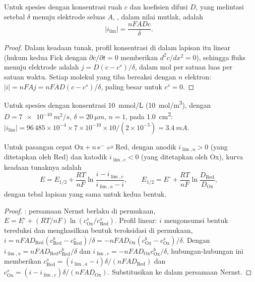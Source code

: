 \begin{theorem}\label{thm:b2:current-potential-curves:limiting}
Untuk spesies dengan konsentrasi ruah $c$ dan koefisien difusi $D$, yang
melintasi  setebal $\delta$ menuju elektrode seluas $A$, , dalam nilai mutlak, adalah
\[
  |i_{\lim}| = \frac{nFADc}{\delta} .
\]
\end{theorem}

\begin{proof}
Dalam keadaan tunak, profil konsentrasi di dalam lapisan itu linear (hukum
kedua Fick dengan $\partial c/\partial t = 0$ memberikan $d^2c/dx^2 = 0$),
sehingga fluks menuju elektrode adalah $j = D(c - c^s)/\delta$, dalam mol
per satuan luas per satuan waktu. Setiap molekul yang tiba bereaksi dengan
$n$ elektron: $|i| = nFAj =
nFAD(c - c^s)/\delta$, paling besar untuk
$c^s = 0$.
\end{proof}

\begin{example}\label{ex:b2:current-potential-curves:ilim}
Untuk spesies dengan konsentrasi \qty{10}{mmol/L} (\qty{10}{mol/m^3}),
dengan $D =
\qty{7e-10}{m^2/s}$, $\delta = \qty{20}{\micro m}$, $n = 1$,
pada \qty{1.0}{cm^2}: $|i_{\lim}| = 96\,485 \times 10^{-4} \times 7 \times 10^{-10}
\times 10/(2 \times 10^{-5}) = \qty{3.4}{mA}$.
\end{example}

\begin{theorem}\label{thm:b2:current-potential-curves:wave}
Untuk pasangan cepat $\mathrm{Ox} + n\,\mathrm e^- \rightleftharpoons \mathrm{Red}$,
dengan  anodik $i_{\lim,a} > 0$ (yang ditetapkan oleh Red) dan
 katodik $i_{\lim,c} < 0$ (yang ditetapkan oleh Ox), kurva
keadaan tunaknya adalah
\[
  E = E_{1/2} + \frac{RT}{nF}\ln\frac{i - i_{\lim,c}}{i_{\lim,a} - i},
  \qquad E_{1/2} = E^\circ + \frac{RT}{nF}\ln\frac{D_{\text{Red}}}{D_{\text{Ox}}} ,
\]
dengan tebal lapisan yang sama untuk kedua bentuk.
\end{theorem}

\begin{proof}
: persamaan Nernst berlaku di permukaan,
$E = E^\circ + (RT/nF)
\ln(c^s_{\text{Ox}}/c^s_{\text{Red}})$. Profil linear:
 $i$ mengonsumsi bentuk tereduksi dan menghasilkan bentuk
teroksidasi di permukaan,
$i = nFAD_{\text{Red}}(c^b_{\text{Red}}
- c^s_{\text{Red}})/\delta = -nFAD_{\text{Ox}}(c^b_{\text{Ox}} - c^s_{\text{Ox}})/\delta$.
Dengan $i_{\lim,a} = nFAD_{\text{Red}}c^b_{\text{Red}}/\delta$ dan
$i_{\lim,c} =
-nFAD_{\text{Ox}}c^b_{\text{Ox}}/\delta$, hubungan-hubungan
ini memberikan $c^s_{\text{Red}} = (i_{\lim,a} -
i)\delta/(nFAD_{\text{Red}})$ dan
$c^s_{\text{Ox}} = (i - i_{\lim,c})\delta/(nFAD_{\text{Ox}})$.
Substitusikan ke dalam persamaan Nernst.
\end{proof}

